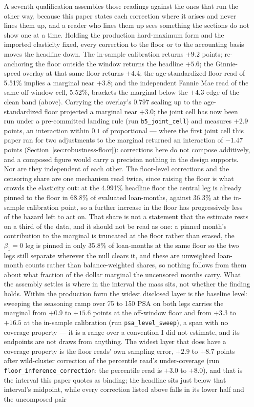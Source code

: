 \documentclass[12pt]{article}
\begin{document}
A seventh qualification assembles those readings against the ones that run the other way, because this paper states each correction where it arises and never lines them up, and a reader who lines them up sees something the sections do not show one at a time. Holding the production hard-maximum form and the imported elasticity fixed, every correction to the floor or to the accounting basis moves the headline down. The in-sample calibration returns $+9.2$ points; re-anchoring the floor outside the window returns the headline $+5.6$; the Ginnie-speed overlay at that same floor returns $+4.4$; the age-standardized floor read of 5.51\% implies a marginal near $+3.8$; and the independent Fannie Mae read of the same off-window cell, 5.52\%, brackets the marginal below the $+4.3$ edge of the clean band (above). Carrying the overlay's $0.797$ scaling up to the age-standardized floor projected a marginal near $+3.0$; the joint cell has now been run under a pre-committed landing rule (run \texttt{b5\_joint\_cell}) and measures $+2.9$ points, an interaction within $0.1$ of proportional --- where the first joint cell this paper ran for two adjustments to the marginal returned an interaction of $-1.47$ points (Section~\ref{sec:robustness-floor}): corrections here do not compose additively, and a composed figure would carry a precision nothing in the design supports. Nor are they independent of each other. The floor-level corrections and the censoring share are one mechanism read twice, since raising the floor is what crowds the elasticity out: at the 4.991\% headline floor the central leg is already pinned to the floor in 68.8\% of evaluated loan-months, against 36.3\% at the in-sample calibration point, so a further increase in the floor has progressively less of the hazard left to act on. That share is not a statement that the estimate rests on a third of the data, and it should not be read as one: a pinned month's contribution to the marginal is truncated at the floor rather than erased, the $\beta_1 = 0$ leg is pinned in only 35.8\% of loan-months at the same floor so the two legs still separate wherever the null clears it, and these are unweighted loan-month counts rather than balance-weighted shares, so nothing follows from them about what fraction of the dollar marginal the uncensored months carry. What the assembly settles is where in the interval the mass sits, not whether the finding holds. Within the production form the widest disclosed layer is the baseline level: sweeping the seasoning ramp over 75 to 150 PSA on both legs carries the marginal from $+0.9$ to $+15.6$ points at the off-window floor and from $+3.3$ to $+16.5$ at the in-sample calibration (run \texttt{psa\_level\_sweep}), a span with no coverage property --- it is a range over a convention I did not estimate, and its endpoints are not draws from anything. The widest layer that does have a coverage property is the floor reads' own sampling error, $+2.9$ to $+8.7$ points after wild-cluster correction of the percentile read's under-coverage (run \texttt{floor\_inference\_correction}; the percentile read is $+3.0$ to $+8.0$), and that is the interval this paper quotes as binding; the headline sits just below that interval's midpoint, while every correction listed above falls in its lower half and the uncomposed pair 
\end{document}
